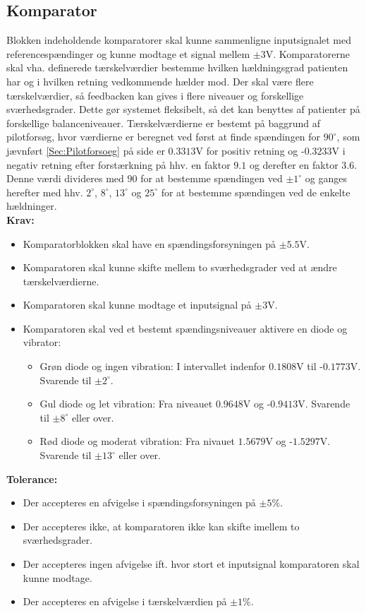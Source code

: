 \subsection{Komparator}\label{KomparatorAfs} 
Blokken indeholdende komparatorer skal kunne sammenligne inputsignalet med referencespændinger og kunne modtage et signal mellem $\pm3$V. Komparatorerne skal vha. definerede tærskelværdier bestemme hvilken hældningsgrad patienten har og i hvilken retning vedkommende hælder mod. Der skal være flere tærskelværdier, så feedbacken kan gives i flere niveauer og forskellige sværhedsgrader. Dette gør systemet fleksibelt, så det kan benyttes af patienter på forskellige balanceniveauer. Tærskelværdierne er bestemt på baggrund af pilotforsøg, hvor værdierne er beregnet ved først at finde spændingen for $90^{\circ}$, som jævnført \ref{Sec:Pilotforsoeg} på side \pageref{Sec:Pilotforsoeg} er $0.3313$V for positiv retning og -$0.3233$V i negativ retning efter forstærkning på hhv. en faktor $9.1$ og derefter en faktor $3.6$. Denne værdi divideres med $90$ for at bestemme spændingen ved $\pm1^{\circ}$ og ganges herefter med hhv. $2^{\circ}$,  $8^{\circ}$, $13^{\circ}$ og $25^{\circ}$ for at bestemme spændingen ved de enkelte hældninger.\\
\textbf{Krav:} 
\begin{itemize}
	\item Komparatorblokken skal have en spændingsforsyningen på $\pm5.5$V.
	\item Komparatoren skal kunne skifte mellem to sværhedsgrader ved at ændre tærskelværdierne.
	\item Komparatoren skal kunne modtage et inputsignal på $\pm3$V. 
	\item Komparatoren skal ved et bestemt spændingsniveauer aktivere en diode og vibrator:
	\begin{itemize}
		\item Grøn diode og ingen vibration: I intervallet indenfor $0.1808$V til -$0.1773$V. Svarende til $\pm2^{\circ}$.
		\item Gul diode og let vibration: Fra niveauet $0.9648$V og -$0.9413$V. Svarende til $\pm 8^{\circ}$ eller over.
		\item Rød diode og moderat vibration: Fra nivauet $1.5679$V og -$1.5297$V. Svarende til $\pm13^{\circ}$ eller over.
	\end{itemize}
\end{itemize}
\textbf{Tolerance:}
\begin{itemize}
	\item Der accepteres en afvigelse i spændingsforsyningen på $\pm5\%$.
	\item Der accepteres ikke, at komparatoren ikke kan skifte imellem to sværhedsgrader.
	\item Der accepteres ingen afvigelse ift. hvor stort et inputsignal komparatoren skal kunne modtage.
	\item Der accepteres en afvigelse i tærskelværdien på $\pm1\%$.
\end{itemize}
